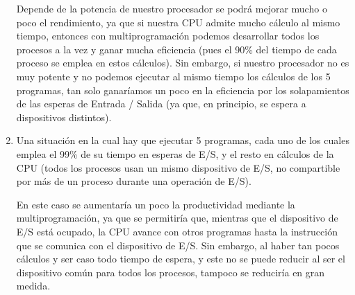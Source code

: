 \begin{ejercicio}
\begin{enumerate}
    Depende de la potencia de nuestro procesador se podrá mejorar mucho o poco el rendimiento, ya que si nuestra CPU admite mucho cálculo al mismo tiempo, entonces con multiprogramación podemos desarrollar todos los procesos a la vez y ganar mucha eficiencia (pues el 90\% del tiempo de cada proceso se emplea en estos cálculos). Sin embargo, si nuestro procesador no es muy potente y no podemos ejecutar al mismo tiempo los cálculos de los 5 programas, tan solo ganaríamos un poco en la eficiencia por los solapamientos de las esperas de Entrada / Salida (ya que, en principio, se espera a dispositivos distintos).
    \item Una situación en la cual hay que ejecutar 5 programas, cada uno de los cuales emplea el 99\% de su tiempo en esperas de E/S, y el resto en cálculos de la CPU (todos los procesos usan un mismo dispositivo de E/S, no compartible por más de un proceso durante una operación de E/S).

    En este caso se aumentaría un poco la productividad mediante la multiprogramación, ya que se permitiría que, mientras que el dispositivo de E/S está ocupado, la CPU avance con otros programas hasta la instrucción que se comunica con el dispositivo de E/S. Sin embargo, al haber tan pocos cálculos y ser caso todo tiempo de espera, y este no se puede reducir al ser el dispositivo común para todos los procesos, tampoco se reduciría en gran medida.
\end{enumerate}

\end{ejercicio}




